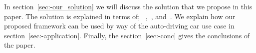 In section~\ref{sec:-our_solution} we will discuss the solution that we propose in this paper. The solution is explained in terms of; ~,~, and~. We explain how our proposed framework can be used by way of the auto-driving car use case in section~\ref{sec:-application}. Finally, the section~\ref{sec:-conc} gives the conclusions of the paper.  

